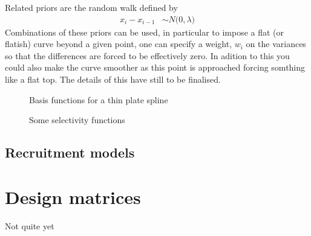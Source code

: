 \documentclass[a4paper,english]{article}
\begin{document}
Related priors are the random walk defined by
\begin{align*}
  x_i - x_{i-1} &\sim N\bigg(0, \lambda \bigg)
\end{align*}
Combinations of these priors can be used, in particular to impose a flat (or flatish) curve beyond a given point, one can specify a weight, $w_i$ on the variances so that the differences are forced to be effectively zero.  In adition to this you could also make the curve smoother as this point is approached forcing somthing like a flat top.  The details of this have still to be finalised.




\begin{figure}[H]
\centering
\caption{Basis functions for a thin plate spline}
\label{fig:tpbfuns}
\end{figure}

\begin{figure}[H]
\centering
\caption{Some selectivity functions}
\label{fig:selfuns}
\end{figure}


\subsection{Recruitment models}



\appendix

\section{Design matrices}
\label{sec:designmats}

Not quite yet
\end{document}

